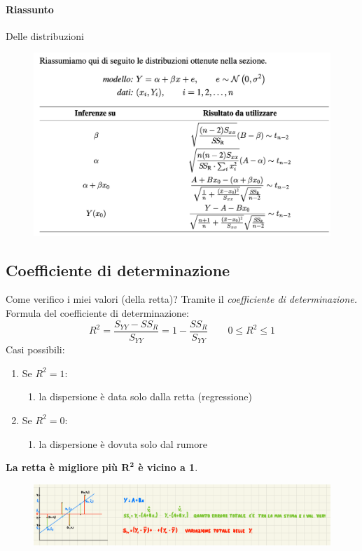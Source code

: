 \documentclass[]{article}
\begin{document}
    \paragraph{Riassunto} Delle distribuzioni
    \begin{figure}[H]
        \includegraphics[width=\textwidth]{images/boh_13.png}
    \end{figure}
    \subsection{Coefficiente di determinazione}
    Come verifico i miei valori (della retta)? Tramite il \textit{coefficiente di determinazione.}
    Formula del coefficiente di determinazione:
    \[ R^2 = \frac{S_{YY}-SS_R}{S_{YY}} = 1- \frac{SS_R}{S_{YY}} \quad  \quad 0 \leq R^2 \leq 1 \]
    Casi possibili:
    \begin{enumerate}
        \item Se $R^2 = 1$:
        \begin{enumerate}
            \item la dispersione è data solo dalla retta (regressione)
        \end{enumerate}
        \item Se $R^2 = 0$:
        \begin{enumerate}
            \item la dispersione è dovuta solo dal rumore
        \end{enumerate}
    \end{enumerate}
    \textbf{La retta è migliore più $\boldsymbol{R^2}$ è vicino a 1}.
    \begin{figure}[H]
        \includegraphics[width=\textwidth]{images/boh_14.png}
    \end{figure}
\end{document}
